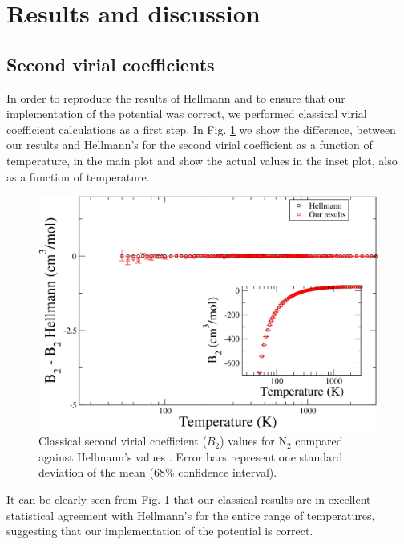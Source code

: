 \section{Results and discussion}
    \subsection{Second virial coefficients}
        In order to reproduce the results of Hellmann and to ensure that our implementation of the \abinitio{} potential was correct, we performed classical virial coefficient calculations as a first step. In Fig. \ref{fig:B2CLN2} we show the difference, between our results and Hellmann's for the second virial coefficient as a function of temperature, in the main plot and show the actual values in the inset plot, also as a function of temperature.
        \begin{figure}[!htbp]
            \centering
            \includegraphics[scale=0.20,keepaspectratio]{Chapter-5/Figures/B2CL9sResultsAll.png}
            \caption{Classical second virial coefficient ($B_2$) values for N$_2$ compared against Hellmann's values \cite{Hellmann2013}. Error bars represent one standard deviation of the mean (68\% confidence interval). }
            \label{fig:B2CLN2}
        \end{figure}
        It can be clearly seen from Fig. \ref{fig:B2CLN2} that our classical results are in excellent statistical agreement with Hellmann's for the entire range of temperatures, suggesting that our implementation of the \abinitio{} potential is correct.

